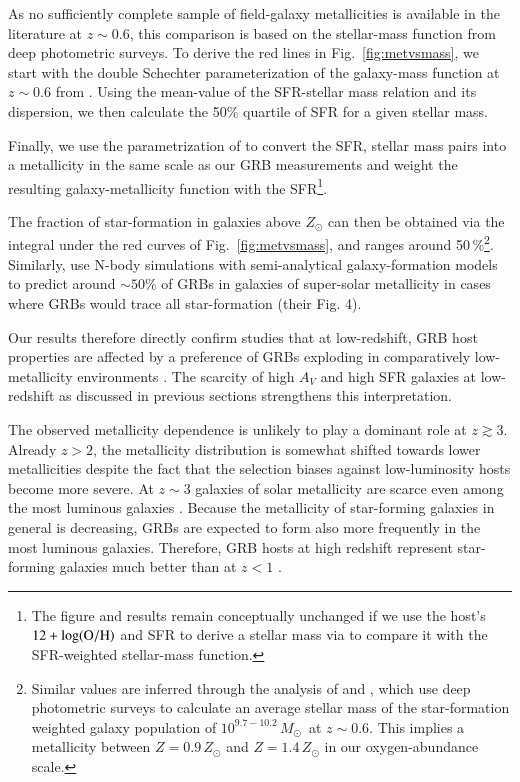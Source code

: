 \documentclass[traditabstract, longauth]{aa}
\newcommand{\oh}{12+\log(\rm{O/H})}
\newcommand{\Msun}{$M_\odot$}
\begin{document}
 {As no sufficiently complete sample of field-galaxy metallicities is available in the literature at $z\sim0.6$, this comparison is based on the stellar-mass function from deep photometric surveys. To derive the red lines in Fig.~\ref{fig:metvsmass}, we start with the double Schechter parameterization of the galaxy-mass function at $z\sim0.6$ from \citet{2014ApJ...783...85T}. Using the mean-value of the SFR-stellar mass relation and its dispersion, we then calculate the 50\% quartile of SFR for a given stellar mass. }
 
 {Finally, we use the parametrization of \citet{2010MNRAS.408.2115M} to convert the SFR, stellar mass pairs into a metallicity in the same scale as our GRB measurements and weight the resulting galaxy-metallicity function with the SFR\footnote{The figure and results remain conceptually unchanged if we use the host's $\oh$ and SFR to derive a stellar mass via \citet{2010MNRAS.408.2115M} to compare it with the SFR-weighted stellar-mass function.}.}

 {The fraction of star-formation in galaxies above $Z_{\odot}$ can then be obtained via the integral under the red curves of Fig.~\ref{fig:metvsmass}, and ranges around 50\,\%\footnote{Similar values are inferred through the analysis of \citet{2013ApJ...778..128P} and \citet{2014A&A...565A.112H}, which use deep photometric surveys \citep{2009ApJ...702.1393K, 2013A&A...556A..55I} to calculate an average stellar mass of the star-formation weighted galaxy population of $10^{9.7-10.2}$\,\Msun\, at $z\sim0.6$. This implies a metallicity between $Z=0.9\,Z_{\odot}$ and $Z=1.4\,Z_{\odot}$ \citep{2010MNRAS.408.2115M} in our oxygen-abundance scale.}. Similarly, \citet[][]{2011MNRAS.417.1013C} use N-body simulations with semi-analytical galaxy-formation models to predict around $\sim 50\%$ of GRBs in galaxies of super-solar metallicity in cases where GRBs would trace all star-formation (their Fig. 4).}

Our results therefore directly confirm studies that at low-redshift, GRB host properties are affected by a preference of GRBs exploding in comparatively low-metallicity environments \citep[e.g.,][Perley et al. 2015c]{2006ApJ...642..636L, 2009ApJ...702..377K, 2010AJ....140.1557L, 2013ApJ...774..119G, 2013ApJ...778..128P, 2014arXiv1409.7064V, 2015arXiv150304246S}. The scarcity of high $A_V$ and high SFR galaxies at low-redshift as discussed in previous sections strengthens this interpretation.

The observed metallicity dependence is unlikely to play a dominant role at $z\gtrsim3$. Already $z > 2$, the metallicity distribution is somewhat shifted towards lower metallicities despite the fact that the selection biases against low-luminosity hosts become more severe. At $z\sim3$ galaxies of solar metallicity are scarce even among the most luminous galaxies \citep{2014A&A...563A..58T}. Because the metallicity of star-forming galaxies in general is decreasing, GRBs are expected to form also more frequently in the most luminous galaxies. Therefore, GRB hosts at high redshift represent star-forming galaxies much better than at $z<1$ \citep[see also][]{2015arXiv150305323G, 2015arXiv150402479P}.
\end{document}
